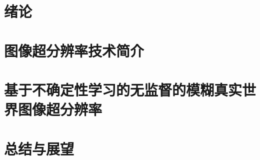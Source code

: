 \documentclass{xduugthesis}
\begin{document}
\chapter{绪论}

\chapter{图像超分辨率技术简介}

\chapter{基于不确定性学习的无监督的模糊真实世界图像超分辨率}

\chapter{总结与展望}

\end{document}
